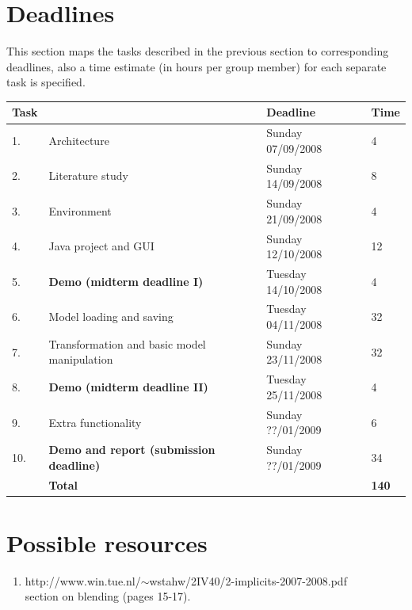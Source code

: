 \documentclass[10pt]{report}
\begin{document}
\section{Deadlines}
This section maps the tasks described in the previous section to corresponding deadlines, also a time estimate (in hours per group member) for each separate task is specified.\\

\begin{longtable}{|p{2pt} l|l|l|}
	\hline
	\textbf{Task}    &                                   & \textbf{Deadline}  & \textbf{Time}\\
	\hline
	1. & Architecture                                   & Sunday 07/09/2008  & 4 \\
	2. & Literature study                               & Sunday 14/09/2008  & 8 \\
	3. & Environment                                    & Sunday 21/09/2008  & 4 \\
	4. & Java project and GUI                           & Sunday 12/10/2008  & 12 \\
	5. & \textbf{Demo (midterm deadline I)}             & Tuesday 14/10/2008 & 4 \\
	6. & Model loading and saving                       & Tuesday 04/11/2008 & 32 \\
	7. & Transformation and basic model manipulation    & Sunday 23/11/2008  & 32 \\
	8. & \textbf{Demo (midterm deadline II)}            & Tuesday 25/11/2008 & 4 \\
	9. & Extra functionality                            & Sunday ??/01/2009  & 6 \\
	10.& \textbf{Demo and report (submission deadline)} & Sunday ??/01/2009  & 34 \\
	\hline
	& \textbf{Total}                                    &                    & \textbf{140} \\
	\hline
\end{longtable}

\section{Possible resources}
\begin{enumerate}
	\item http://www.win.tue.nl/$\sim$wstahw/2IV40/2-implicits-2007-2008.pdf\\
          section on blending (pages 15-17).
\end{enumerate}
\end{document}
